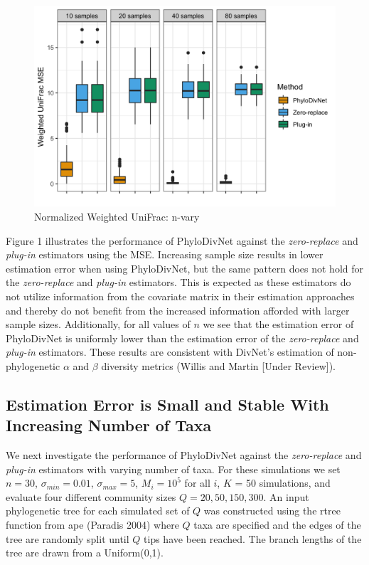 \documentclass{article}
\newcommand*{\myfont}{\fontfamily{lmtt}\selectfont}
\begin{document}
\begin{figure}[!htb]
 \captionsetup{singlelinecheck = false, format= hang, justification = raggedright, font = sf, labelsep = space}
  \caption{Normalized Weighted UniFrac: n-vary}
  \centering
  \includegraphics[width=\textwidth]{n_vary.png}
\end{figure}

Figure 1 illustrates the performance of {\myfont PhyloDivNet} against the \textit{zero-replace} and \textit{plug-in} estimators using the MSE. Increasing sample size results in lower estimation error when using {\myfont PhyloDivNet}, but the same pattern does not hold for the \textit{zero-replace} and \textit{plug-in} estimators. This is expected as these estimators do not utilize information from the covariate matrix in their estimation approaches and thereby do not benefit from the increased information afforded with larger sample sizes. Additionally, for all values of $n$ we see that the estimation error of {\myfont PhyloDivNet} is uniformly lower than the estimation error of the \textit{zero-replace} and \textit{plug-in} estimators.  These results are consistent with {\myfont DivNet}'s estimation of non-phylogenetic $\alpha$ and $\beta$ diversity metrics (Willis and Martin [Under Review]).

\subsection{Estimation Error is Small and Stable With Increasing Number of Taxa}
We next investigate the performance of {\myfont PhyloDivNet} against the \textit{zero-replace} and \textit{plug-in} estimators with varying number of taxa. For these simulations we set $n = 30$, $\sigma_{min} = 0.01$, $\sigma_{max} = 5$, $M_{i} = 10^5$ for all $i$, $K$ = 50 simulations, and evaluate four different community sizes $Q = 20, 50, 150, 300$. An input phylogenetic tree for each simulated set of $Q$ was constructed using the {\myfont rtree} function from {\myfont ape} (Paradis 2004) where $Q$ taxa are specified and the edges of the tree are randomly split until $Q$ tips have been reached. The branch lengths of the tree are drawn from a Uniform(0,1).
\end{document}
